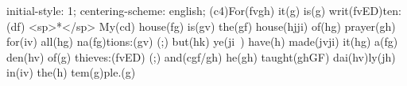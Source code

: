 initial-style: 1;
centering-scheme: english;
(c4)For(fvgh) it(g) is(g) writ(fvED)ten:(df) <sp>*</sp> My(cd) house(fg) is(gv) the(gf) house(hjji) of(hg) prayer(gh) for(iv) all(hg) na(fg)tions:(gv) (;) but(hk) ye(ji~) have(h) made(jvji) it(hg) a(fg) den(hv) of(g) thieves:(fvED) (;) and(cgf/gh) he(gh) taught(ghGF) dai(hv)ly(jh) in(iv) the(h) tem(g)ple.(g)
